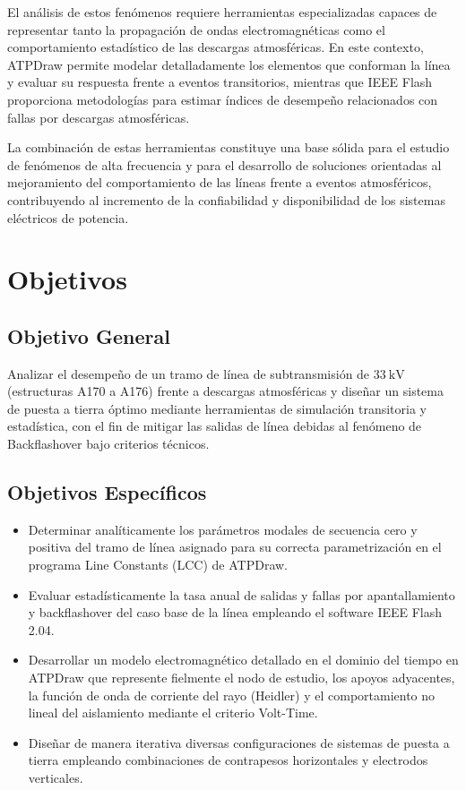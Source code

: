 \documentclass[12pt,letterpaper]{article}
\begin{document}
El análisis de estos fenómenos requiere herramientas especializadas capaces de representar tanto la propagación de ondas electromagnéticas como el comportamiento estadístico de las descargas atmosféricas. En este contexto, ATPDraw permite modelar detalladamente los elementos que conforman la línea y evaluar su respuesta frente a eventos transitorios, mientras que IEEE Flash proporciona metodologías para estimar índices de desempeño relacionados con fallas por descargas atmosféricas.

La combinación de estas herramientas constituye una base sólida para el estudio de fenómenos de alta frecuencia y para el desarrollo de soluciones orientadas al mejoramiento del comportamiento de las líneas frente a eventos atmosféricos, contribuyendo al incremento de la confiabilidad y disponibilidad de los sistemas eléctricos de potencia.


\section{Objetivos}

\subsection{Objetivo General}
Analizar el desempeño de un tramo de línea de subtransmisión de $\SI{33}{\kV}$ (estructuras A170 a A176) frente a descargas atmosféricas y diseñar un sistema de puesta a tierra óptimo mediante herramientas de simulación transitoria y estadística, con el fin de mitigar las salidas de línea debidas al fenómeno de Backflashover bajo criterios técnicos.

\subsection{Objetivos Específicos}
\begin{itemize}
    \item Determinar analíticamente los parámetros modales de secuencia cero y positiva del tramo de línea asignado para su correcta parametrización en el programa Line Constants (LCC) de ATPDraw.
    \item Evaluar estadísticamente la tasa anual de salidas y fallas por apantallamiento y backflashover del caso base de la línea empleando el software IEEE Flash 2.04.
    \item Desarrollar un modelo electromagnético detallado en el dominio del tiempo en ATPDraw que represente fielmente el nodo de estudio, los apoyos adyacentes, la función de onda de corriente del rayo (Heidler) y el comportamiento no lineal del aislamiento mediante el criterio Volt-Time.
    \item Diseñar de manera iterativa diversas configuraciones de sistemas de puesta a tierra empleando combinaciones de contrapesos horizontales y electrodos verticales.
\end{itemize}
\end{document}

